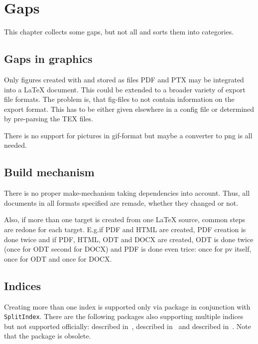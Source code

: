 \chapter{Gaps}\label{chap:gaps}

This chapter collects some gaps, but not all and sorts them into categories. 

\section{Gaps in graphics}\label{sec:gapGraph}

Only figures created with  and stored as files PDF and PTX 
may be integrated into a \LaTeX{} document. 
This could be extended to a broader variety of export file formats. 
The problem is, that fig-files to not contain information on the export
format. 
This has to be either given elsewhere in a config file 
or determined by pre-parsing the TEX files. 

There is no support for pictures in \gls{gif}-format 
but maybe a converter to \gls{png} is all needed. 

\section{Build mechanism}\label{sec:gapBuild}

There is no proper make-mechanism taking dependencies into account. 
Thus, all documents in all formats specified are remade, 
whether they changed or not. 

Also, if more than one target is created from one \LaTeX{} source, 
common steps are redone for each target. 
E.g.\@ if PDF and HTML are created, 
PDF creation is done twice and if PDF, HTML, ODT and DOCX are created, 
ODT is done twice (once for ODT second for DOCX) 
and PDF is done even trice: 
once for pv itself, once for ODT and once for DOCX\@. 

\section{Indices}\label{sec:gapIndices}

Creating more than one index is supported only 
via package  in conjunction with \texttt{SplitIndex}. 
There are the following packages also supporting multiple indices 
but not supported officially: 
 described in~\cite{IndexP}, 
 described in~\cite{AmsmidxP} and 
 described in~\cite{ImakeidxP}.
Note that the package  is obsolete. 

